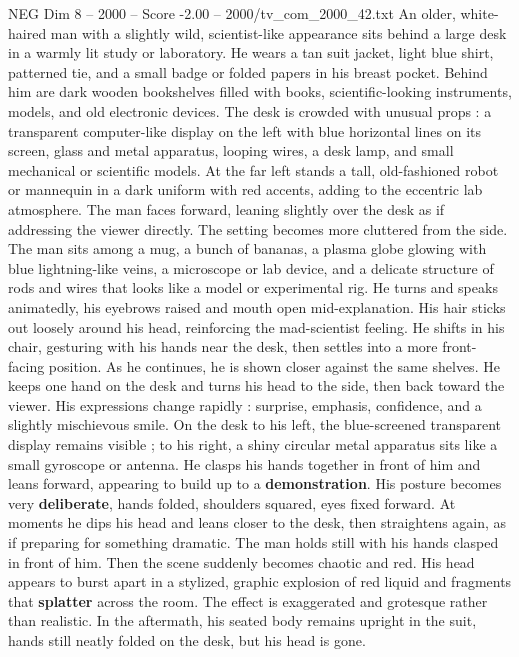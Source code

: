 \begin{textsample}{NEG Dim 8 – 2000 – Score -2.00 – 2000/tv\_com\_2000\_42.txt}  \label{ex:f8_neg_090}
An older, white-haired man with a slightly wild, scientist-like appearance sits behind a large desk in a warmly lit study or laboratory.
He wears a tan suit jacket, light blue shirt, patterned tie, and a small badge or folded papers in his breast pocket.
Behind him are dark wooden bookshelves filled with books, scientific-looking instruments, models, and old electronic devices.
The desk is crowded with unusual props : a transparent computer-like display on the left with blue horizontal lines on its screen, glass and metal apparatus, looping wires, a desk lamp, and small mechanical or scientific models.
At the far left stands a tall, old-fashioned robot or mannequin in a dark uniform with red accents, adding to the eccentric lab atmosphere.
The man faces forward, leaning slightly over the desk as if addressing the viewer directly.
The setting becomes more cluttered from the side.
The man sits among a mug, a bunch of bananas, a plasma globe glowing with blue lightning-like veins, a microscope or lab device, and a delicate structure of rods and wires that looks like a model or experimental rig.
He turns and speaks animatedly, his eyebrows raised and mouth open mid-explanation.
His hair sticks out loosely around his head, reinforcing the mad-scientist feeling.
He shifts in his chair, gesturing with his hands near the desk, then settles into a more front-facing position.
As he continues, he is shown closer against the same shelves.
He keeps one hand on the desk and turns his head to the side, then back toward the viewer.
His expressions change rapidly : surprise, emphasis, confidence, and a slightly mischievous smile.
On the desk to his left, the blue-screened transparent display remains visible ; to his right, a shiny circular metal apparatus sits like a small gyroscope or antenna.
He clasps his hands together in front of him and leans forward, appearing to build up to a \textbf{demonstration}.
His posture becomes very \textbf{deliberate}, hands folded, shoulders squared, eyes fixed forward.
At moments he dips his head and leans closer to the desk, then straightens again, as if preparing for something dramatic.
The man holds still with his hands clasped in front of him.
Then the scene suddenly becomes chaotic and red.
His head appears to burst apart in a stylized, graphic explosion of red liquid and fragments that \textbf{splatter} across the room.
The effect is exaggerated and grotesque rather than realistic.
In the aftermath, his seated body remains upright in the suit, hands still neatly folded on the desk, but his head is gone.

\end{textsample}
